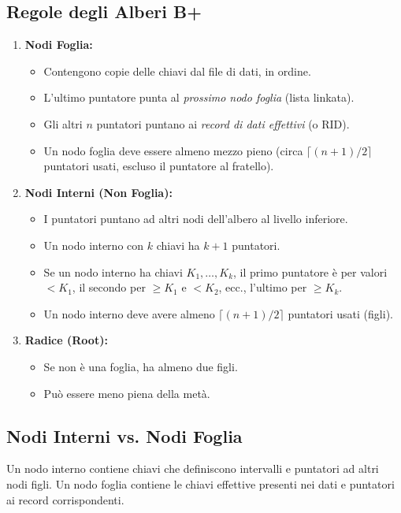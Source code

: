 \subsection{Regole degli Alberi B+}
\begin{enumerate}
    \item \textbf{Nodi Foglia:}
    \begin{itemize}
        \item Contengono copie delle chiavi dal file di dati, in ordine.
        \item L'ultimo puntatore punta al \textit{prossimo nodo foglia} (lista linkata).
        \item Gli altri $n$ puntatori puntano ai \textit{record di dati effettivi} (o RID).
        \item Un nodo foglia deve essere almeno mezzo pieno (circa $\lceil (n+1)/2 \rceil$ puntatori usati, escluso il puntatore al fratello).
    \end{itemize}
    \item \textbf{Nodi Interni (Non Foglia):}
    \begin{itemize}
        \item I puntatori puntano ad altri nodi dell'albero al livello inferiore.
        \item Un nodo interno con $k$ chiavi ha $k+1$ puntatori.
        \item Se un nodo interno ha chiavi $K_1, \ldots, K_k$, il primo puntatore è per valori $< K_1$, il secondo per $\geq K_1 \text{ e } < K_2$, ecc., l'ultimo per $\geq K_k$.
        \item Un nodo interno deve avere almeno $\lceil (n+1)/2 \rceil$ puntatori usati (figli).
    \end{itemize}
    \item \textbf{Radice (Root):}
    \begin{itemize}
        \item Se non è una foglia, ha almeno due figli.
        \item Può essere meno piena della metà.
    \end{itemize}
\end{enumerate}

\subsection{Nodi Interni vs. Nodi Foglia}
Un nodo interno contiene chiavi che definiscono intervalli e puntatori ad altri nodi figli. Un nodo foglia contiene le chiavi effettive presenti nei dati e puntatori ai record corrispondenti.

